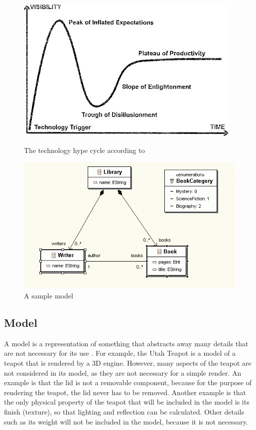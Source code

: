 \begin{figure}
\begin{minipage}{0.5\textwidth}
	\includegraphics[width=0.9\linewidth]{figures/mde_pos.jpg}
\caption{The technology hype cycle according to \citet{brambillaBook}}
\label{mde_pos}
\end{minipage}
\begin{minipage}{0.49\textwidth}
	\includegraphics[width=0.9\linewidth]{figures/sample_model.png}
\caption{A sample model \citep{sampleModel}}
\label{uml_sample}
\end{minipage}
\end{figure}

\subsection{Model}

A model is a representation of something that abstracts away many details that are not necessary for its use \citep{brambillaBook}. For example, the Utah Teapot \citep{utahTeapot} is a model of a teapot that is rendered by a 3D engine. However, many aspects of the teapot are not considered in its model, as they are not necessary for a simple render. An example is that the lid is not a removable component, because for the purpose of rendering the teapot, the lid never has to be removed. Another example is that the only physical property of the teapot that will be included in the model is its finish (texture), so that lighting and reflection can be calculated. Other details such as its weight will not be included in the model, because it is not necessary.

